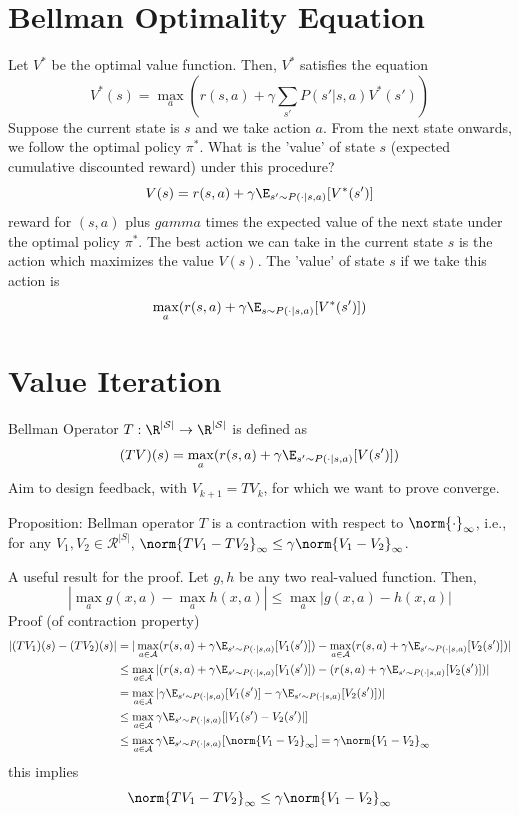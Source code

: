 \section{Bellman Optimality Equation}
Let $V^*$ be the optimal value function. Then, $V^*$ satisfies the equation
\[
    V^*(s) = \max_{a} \left( r(s,a) + \gamma \sum_{s'} P(s' | s,a) V^*(s') \right)
\]
Suppose the current state is $s$ and we take action $a$. From the next state onwards, we follow the optimal policy $\pi^*$. What
is the 'value' of state $s$ (expected cumulative discounted reward) under this procedure?
\[
    V(s) = r(s,a) + \gamma \E_{s' \sim P(\cdot | s,a)} [V^*(s')]
\]
reward for $(s,a)$ plus $gamma$ times the expected value of the next state under the optimal policy $\pi^*$. The best action we can take
in the current state $s$ is the action which maximizes the value $V(s)$. The 'value' of state $s$ if we take this action is
\[
    \max_{a} (r(s,a) + \gamma \E_{s\sim P(\cdot | s,a)} [V^*(s')])
\]
\section{Value Iteration}
Bellman Operator $T: \R^{|\mathcal{S}|} \to \R^{|\mathcal{S}|}$ is defined as
\[
    (TV)(s) = \max_{a} (r(s, a) + \gamma \E_{s' \sim P(\cdot | s, a)}[V(s')])
\]
Aim to design feedback, with $V_{k+1} = TV_k$, for which we want to prove converge.

Proposition: Bellman operator $T$ is a contraction with respect to $\norm{\cdot}_\infty$, i.e., for any $V_1, V_2 \in \mathcal{R}^{|S|}$,
$\norm{TV_1 - TV_2}_{\infty} \leq \gamma \norm{V_1 - V_2}_{\infty}$.

A useful result for the proof. Let $g,h$ be any two real-valued function. Then,
\[
    | \max_{a} g(x,a) - \max_{a} h(x,a) | \leq \max_{a} |g(x, a) - h(x, a)|
\]
Proof (of contraction property)
\begin{align*}
    |(TV_1)(s) - (TV_2)(s)| & = |\max_{a \in \mathcal{A}}(r(s,a) + \gamma \E_{s' \sim P(\cdot | s, a)}[V_1(s')]) - \max_{a \in \mathcal{A}}(r(s,a) + \gamma \E_{s' \sim P(\cdot | s, a)}[V_2(s')])| \\
                            & \leq \max_{a \in \mathcal{A}} |(r(s,a) + \gamma \E_{s' \sim P(\cdot | s, a)}[V_1(s')]) - (r(s,a) + \gamma \E_{s' \sim P(\cdot | s, a)}[V_2(s')])|                     \\
                            & = \max_{a \in \mathcal{A}} |\gamma \E_{s' \sim P(\cdot | s, a)}[V_1(s')] - \gamma \E_{s' \sim P(\cdot | s, a)}[V_2(s')])|                                             \\
                            & \leq \max_{a \in \mathcal{A}} \gamma \E_{s' \sim P(\cdot | s,a)} [|V_1(s') - V_2(s')|]                                                                                \\
                            & \leq \max_{a \in \mathcal{A}} \gamma \E_{s' \sim P(\cdot| s,a)} [\norm{V_1 - V_2}_{\infty}] = \gamma \norm{V_1 - V_2}_{\infty}
\end{align*}
this implies
\[
    \norm{TV_1 - TV_2}_{\infty} \leq \gamma \norm{V_1 - V_2}_{\infty}
\]